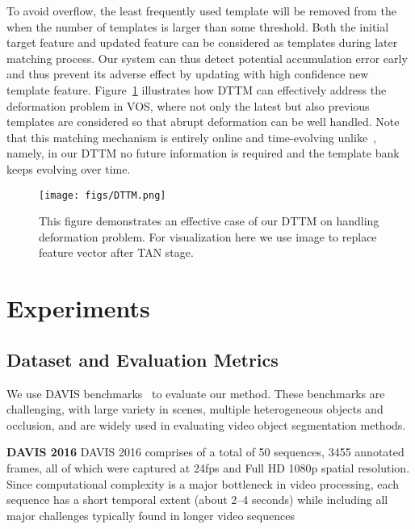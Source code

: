 \documentclass[10pt,twocolumn,letterpaper]{article}
\begin{document}
To avoid overflow, the least frequently used template will be removed from the  when the number of templates is larger than some threshold.  Both the initial target feature and updated feature can be considered as templates during later matching process.
Our system can thus detect potential accumulation error early and thus prevent its adverse effect by updating with high confidence new template feature.
 Figure~\ref{fig:DTTM} illustrates how DTTM can effectively address the deformation problem in VOS,
 where not only the latest but also previous templates are considered so that abrupt deformation can be well handled.
 Note that this matching mechanism is entirely online and time-evolving unlike~\cite{luiten2018premvos}, namely, in our DTTM no future information is required and the template bank keeps evolving over time.




\begin{figure}[]
\begin{center}
   \texttt{[image: figs/DTTM.png]}
\end{center}
\caption{This figure demonstrates an effective case of our DTTM on handling deformation problem. For visualization here we use image to replace feature vector after TAN stage.}
    \vspace*{-15pt}
\label{fig:DTTM}
\end{figure}









\section{Experiments}

\subsection{Dataset and Evaluation Metrics}
We use DAVIS benchmarks~\cite{perazzi2016davis, pont2017davis, caelles2018davis} to evaluate our method.
These benchmarks are challenging, with large variety in scenes, multiple heterogeneous objects and occlusion, and are
widely used in evaluating video object segmentation methods.

\textbf{DAVIS 2016}
DAVIS 2016 comprises of a total of 50 sequences, 3455 annotated frames, all of which were captured at 24fps and Full HD 1080p spatial resolution.
Since computational complexity is a major bottleneck in video processing, each sequence has a short temporal extent (about 2--4 seconds) while including all major challenges typically found in longer video sequences
\end{document}
